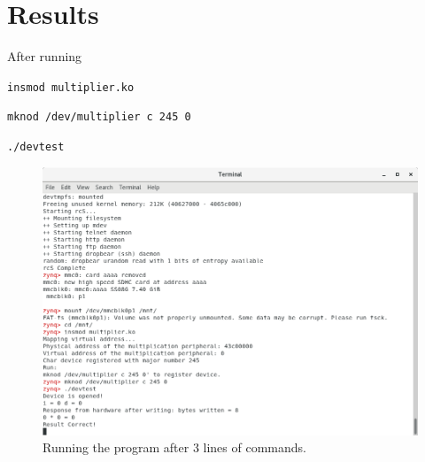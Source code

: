 \documentclass[11pt,letterpaper,titlepage]{article}
\begin{document}
\newpage

\part{Results}

After running

\verb|insmod multiplier.ko|

\verb|mknod /dev/multiplier c 245 0|

\verb|./devtest|

\begin{figure}[ht]
    \centering
    \includegraphics[width=\textwidth]{Register.png}
    \caption{Running the program after 3 lines of commands.}
\end{figure}

\newpage
\end{document}
